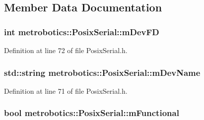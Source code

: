 \subsection{\-Member \-Data \-Documentation}
\hypertarget{classmetrobotics_1_1PosixSerial_a96adceb87053360189a26efb47656750}{
\subsubsection[{m\-Dev\-F\-D}]{\setlength{\rightskip}{0pt plus 5cm}int {\bf metrobotics\-::\-Posix\-Serial\-::m\-Dev\-F\-D}}}\label{classmetrobotics_1_1PosixSerial_a96adceb87053360189a26efb47656750}


\-Definition at line 72 of file \-Posix\-Serial.\-h.

\hypertarget{classmetrobotics_1_1PosixSerial_a647c305dbdff7155b9f70503a5a4142b}{
\subsubsection[{m\-Dev\-Name}]{\setlength{\rightskip}{0pt plus 5cm}std\-::string {\bf metrobotics\-::\-Posix\-Serial\-::m\-Dev\-Name}}}\label{classmetrobotics_1_1PosixSerial_a647c305dbdff7155b9f70503a5a4142b}


\-Definition at line 71 of file \-Posix\-Serial.\-h.

\hypertarget{classmetrobotics_1_1PosixSerial_a68e19a9a6ed15bd9d0e2a0579a3630a1}{
\subsubsection[{m\-Functional}]{\setlength{\rightskip}{0pt plus 5cm}bool {\bf metrobotics\-::\-Posix\-Serial\-::m\-Functional}}}\label{classmetrobotics_1_1PosixSerial_a68e19a9a6ed15bd9d0e2a0579a3630a1}



